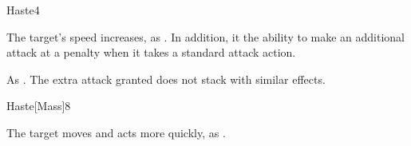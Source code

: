 \begin{spellsection}{Haste}{4}
    \begin{spellheader}
    \end{spellheader}
    \begin{spellcontent}
        \begin{spelltargetinginfo}
        \end{spelltargetinginfo}
        \begin{spelleffects}
            \spelleffect The target's speed increases, as . In addition, it the ability to make an additional attack at a  penalty when it takes a standard attack action.
            \spelldur \durshort
        \end{spelleffects}
    \end{spellcontent}
    \begin{spellfooter}
        \spellnotes As . The extra attack granted does not stack with similar effects.
        \miscastrandom
    \end{spellfooter}
\end{spellsection}

\begin{spellsection}{Haste}[Mass]{8}
    \begin{spellheader}
    \end{spellheader}
    \begin{spellcontent}
        \begin{spelltargetinginfo}
        \end{spelltargetinginfo}
        \begin{spelleffects}
            \spelleffect The target moves and acts more quickly, as .
        \end{spelleffects}
    \end{spellcontent}
    \begin{spellfooter}
        \miscastexplode
    \end{spellfooter}
\end{spellsection}

